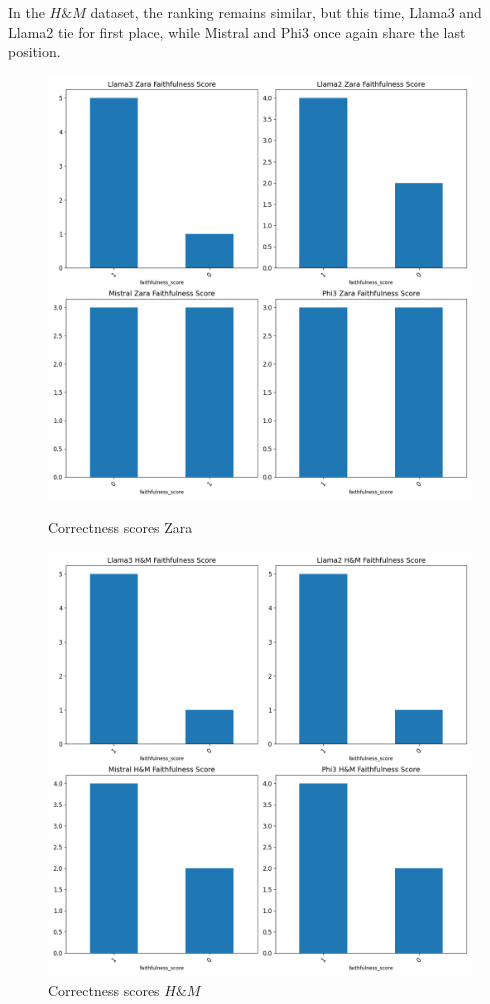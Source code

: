 \documentclass[]{article}
\begin{document}
In the $H\&M$ dataset, the ranking remains similar, but this time, Llama3 and Llama2 tie for first place, while Mistral and Phi3 once again share the last position.
\begin{figure}[H]
    \centering
    \begin{minipage}{0.49\textwidth}
        \centering
        \includegraphics[width=\textwidth]{./images/faith_zara_scene_mit.png}
        \caption{Correctness scores Zara}
        \label{fig:faith_zara}
    \end{minipage}
    \hfill
    \begin{minipage}{0.49\textwidth}
        \centering
        \includegraphics[width=\textwidth]{./images/faith_hm_scene_mit.png}
        \caption{Correctness scores $H\&M$}
        \label{fig:faith_hm}
    \end{minipage}
\end{figure}
\end{document}

